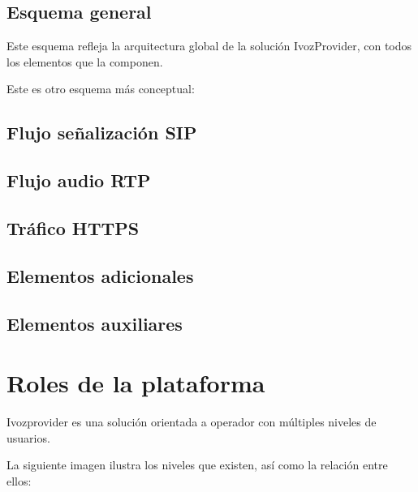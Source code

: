 \documentclass[letterpaper,10pt,spanish]{sphinxmanual}
\begin{document}
\section{Esquema general}
\label{architecture/index:esquema-general}
Este esquema refleja la arquitectura global de la solución IvozProvider, con todos los elementos que la componen.

\noindent{}

Este es otro esquema más conceptual:

\noindent{}


\section{Flujo señalización SIP}
\label{architecture/index:flujo-senalizacion-sip}\label{architecture/index:signallingflow}

\section{Flujo audio RTP}
\label{architecture/index:flujo-audio-rtp}\label{architecture/index:audioflow}

\section{Tráfico HTTPS}
\label{architecture/index:trafico-https}

\section{Elementos adicionales}
\label{architecture/index:elementos-adicionales}

\section{Elementos auxiliares}
\label{architecture/index:elementos-auxiliares}

\chapter{Roles de la plataforma}
\label{operation_roles/index:operation-roles}\label{operation_roles/index:roles-de-la-plataforma}\label{operation_roles/index::doc}
Ivozprovider es una solución orientada a operador con múltiples niveles de usuarios.

La siguiente imagen ilustra los niveles que existen, así como la relación entre ellos:
\end{document}
